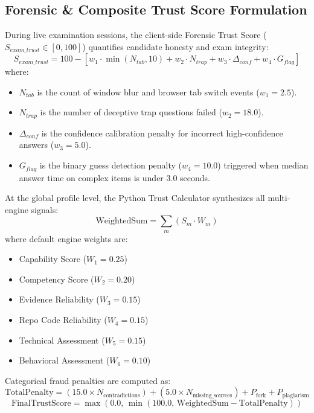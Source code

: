 \subsection{Forensic \& Composite Trust Score Formulation}
During live examination sessions, the client-side Forensic Trust Score ($S_{exam\_trust} \in [0, 100]$) quantifies candidate honesty and exam integrity:
\begin{equation}
S_{exam\_trust} = 100 - \left[ w_1 \cdot \min(N_{tab}, 10) + w_2 \cdot N_{trap} + w_3 \cdot \Delta_{conf} + w_4 \cdot G_{flag} \right]
\end{equation}
where:
\begin{itemize}
    \item $N_{tab}$ is the count of window blur and browser tab switch events ($w_1 = 2.5$).
    \item $N_{trap}$ is the number of deceptive trap questions failed ($w_2 = 18.0$).
    \item $\Delta_{conf}$ is the confidence calibration penalty for incorrect high-confidence answers ($w_3 = 5.0$).
    \item $G_{flag}$ is the binary guess detection penalty ($w_4 = 10.0$) triggered when median answer time on complex items is under 3.0 seconds.
\end{itemize}

At the global profile level, the Python Trust Calculator synthesizes all multi-engine signals:
$$\text{WeightedSum} = \sum_{m} \left( S_m \cdot W_m \right)$$
where default engine weights are:
\begin{itemize}
    \item Capability Score ($W_1 = 0.25$)
    \item Competency Score ($W_2 = 0.20$)
    \item Evidence Reliability ($W_3 = 0.15$)
    \item Repo Code Reliability ($W_4 = 0.15$)
    \item Technical Assessment ($W_5 = 0.15$)
    \item Behavioral Assessment ($W_6 = 0.10$)
\end{itemize}

Categorical fraud penalties are computed as:
$$\text{TotalPenalty} = (15.0 \times N_{\text{contradictions}}) + (5.0 \times N_{\text{missing\_sources}}) + P_{\text{fork}} + P_{\text{plagiarism}}$$
\begin{equation}
\text{FinalTrustScore} = \max\left(0.0, \, \min\left(100.0, \, \text{WeightedSum} - \text{TotalPenalty}\right)\right)
\end{equation}

